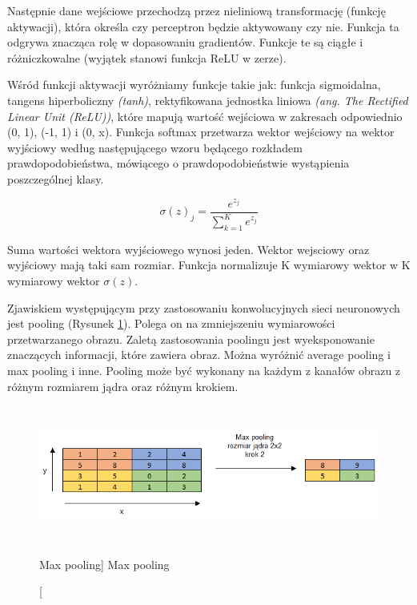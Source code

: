 \documentclass[a4paper,12pt]{article}
\begin{document}
			Następnie dane wejściowe przechodzą przez nieliniową transformację (funkcję aktywacji), która określa czy perceptron będzie aktywowany czy nie. 
			Funkcja ta odgrywa znacząca rolę w dopasowaniu gradientów. Funkcje te są ciągłe i różniczkowalne (wyjątek stanowi funkcja ReLU w zerze).
        
			Wśród funkcji aktywacji wyróżniamy funkcje takie jak: funkcja sigmoidalna,  tangens hiperboliczny \textit{(tanh)}, rektyfikowana jednostka liniowa 
			\textit{(ang. The Rectified Linear Unit (ReLU))}, które mapują wartość wejściowa w zakresach odpowiednio (0, 1), (-1, 1) i (0, x). Funkcja softmax przetwarza wektor wejściowy na wektor wyjściowy według następującego wzoru będącego rozkładem prawdopodobieństwa, 
			mówiącego o prawdopodobieństwie wystąpienia poszczególnej klasy. 
        \begin{center}
			\begin{displaymath}
				\sigma (z)_{j} = \frac{e^{z_{j}}}{ \sum_{k=1}^K e^{z_{j}}}
			\end{displaymath}
			\end{center}
			Suma wartości wektora wyjściowego wynosi jeden. Wektor wejsciowy oraz wyjściowy mają taki sam rozmiar. Funkcja normalizuje K wymiarowy wektor w K wymiarowy wektor  
			$ \sigma (z)$. 
        
	    Zjawiskiem występującym przy zastosowaniu konwolucyjnych sieci neuronowych jest pooling (Rysunek \ref{fig:maxPooling}). Polega on na zmniejszeniu wymiarowości 
			przetwarzanego obrazu. Zaletą zastosowania poolingu jest wyeksponowanie znaczących informacji, które zawiera obraz. Można wyróżnić average 
			pooling i max pooling i inne. Pooling może być wykonany na każdym z kanałów obrazu z różnym rozmiarem jądra oraz różnym krokiem. 
	 
			\begin{figure}[!ht]
				\centering
				\includegraphics[width=17cm, height=4.5cm]{image//maxPoolingImg.png}
				\caption
				[Max pooling]
				{Max pooling}
				\label{fig:maxPooling}
			\end{figure}
        
\end{document}
